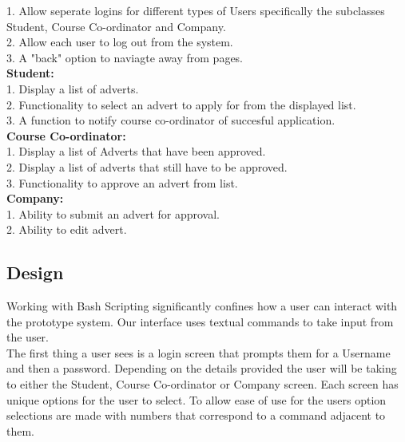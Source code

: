 \documentclass{l3deliverable}
\begin{document}
1. Allow seperate logins for different types of Users specifically the subclasses Student, Course Co-ordinator and Company.\\
2. Allow each user to log out from the system. \\
3. A "back" option to naviagte away from pages.\\

\textbf{Student:}\\

1. Display a list of adverts.\\
2. Functionality to select an advert to apply for from the displayed list.\\
3. A function to notify course co-ordinator of succesful application.\\

\textbf{Course Co-ordinator:}\\

1. Display a list of Adverts that have been approved.\\
2. Display a list of adverts that still have to be approved.\\
3. Functionality to approve an advert from list.\\
 
\textbf{Company:}\\

1. Ability to submit an advert for approval.\\
2. Ability to edit advert.\\

\subsection{Design}

Working with Bash Scripting significantly confines how a user can interact with the prototype system. Our interface uses textual commands to take input from the user. \\

The first thing a user sees is a login screen that prompts them for a Username and then a password. Depending on the details provided the user will be taking to either the Student, Course Co-ordinator or Company screen. Each screen has unique options for the user to select. To allow ease of use for the users option selections are made with numbers that correspond to a command adjacent to them.  



\end{document}

